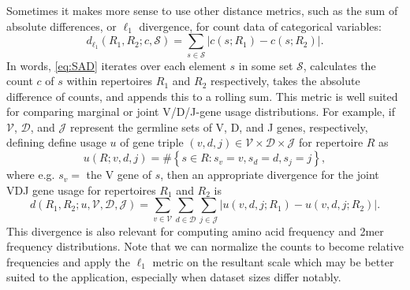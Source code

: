 \documentclass{article}
\begin{document}
Sometimes it makes more sense to use other distance metrics, such as the sum of absolute differences, or $\ell_1$ divergence, for count data of categorical variables:
\begin{equation}\label{eq:SAD}
    d_{\ell_1}(R_1, R_2; c, \mathcal S) = \sum_{s \in \mathcal S} \left| c(s; R_1) - c(s; R_2) \right|.
\end{equation}
In words, \eqref{eq:SAD} iterates over each element $s$ in some set $\mathcal S$, calculates the count $c$ of $s$ within repertoires $R_1$ and $R_2$ respectively, takes the absolute difference of counts, and appends this to a rolling sum.
This metric is well suited for comparing marginal or joint V/D/J-gene usage distributions.
For example, if $\mathcal V$, $\mathcal D$, and $\mathcal J$ represent the germline sets of V, D, and J genes, respectively,
defining define usage $u$ of gene triple $(v, d, j) \in \mathcal V \times \mathcal D \times \mathcal J$ for repertoire $R$ as
\begin{equation}
u(R; v, d, j) = \#\left\{s \in R: s_v = v, s_d = d, s_j = j\right\},
\end{equation}
where e.g. $s_v = $ the V gene of $s$, then an appropriate divergence for the joint VDJ gene usage for repertoires $R_1$ and $R_2$ is
\begin{equation}
d(R_1, R_2; u, \mathcal V, \mathcal D, \mathcal J) = \sum_{v \in \mathcal V} \sum_{d \in \mathcal D} \sum_{j \in \mathcal J} \left| u(v, d, j; R_1) - u(v, d, j; R_2) \right|.
\end{equation}
This divergence is also relevant for computing amino acid frequency and 2mer frequency distributions.
Note that we can normalize the counts to become relative frequencies and apply the $\ell_1$ metric on the resultant scale which may be better suited to the application, especially when dataset sizes differ notably.
\end{document}
